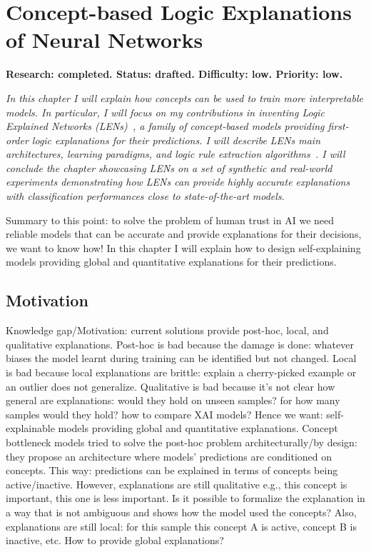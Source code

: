 \documentclass[withindex,glossary]{cam-thesis}
\begin{document}
\chapter{Concept-based Logic Explanations of Neural Networks} \label{chapter:lens}
\textbf{Research: completed. Status: drafted. Difficulty: low. Priority: low.}

\textit{In this chapter I will explain how concepts can be used to train more interpretable models. In particular, I will focus on my contributions in inventing Logic Explained Networks (LENs)~\citep{ciravegna2021logic}, a family of concept-based models providing first-order logic explanations for their predictions. I will describe LENs main architectures, learning paradigms, and logic rule extraction algorithms~\citep{barbiero2021entropy}. I will conclude the chapter showcasing LENs on a set of synthetic and real-world experiments demonstrating how LENs can provide highly accurate explanations with classification performances close to state-of-the-art models.}


Summary to this point: to solve the problem of human trust in AI we need reliable models that can be accurate and provide explanations for their decisions, we want to know how! In this chapter I will explain how to design self-explaining models providing global and quantitative explanations for their predictions.

\section{Motivation}

Knowledge gap/Motivation: current solutions provide post-hoc, local, and qualitative explanations. Post-hoc is bad because the damage is done: whatever biases the model learnt during training can be identified but not changed. Local is bad because local explanations are brittle: explain a cherry-picked example or an outlier does not generalize. Qualitative is bad because it's not clear how general are explanations: would they hold on unseen samples? for how many samples would they hold? how to compare XAI models? Hence we want: self-explainable models providing global and quantitative explanations. Concept bottleneck models tried to solve the post-hoc problem architecturally/by design: they propose an architecture where models' predictions are conditioned on concepts. This way: predictions can be explained in terms of concepts being active/inactive. However, explanations are still qualitative e.g., this concept is important, this one is less important. Is it possible to formalize the explanation in a way that is not ambiguous and shows how the model used the concepts? Also, explanations are still local: for this sample this concept A is active, concept B is inactive, etc. How to provide global explanations?
\end{document}

